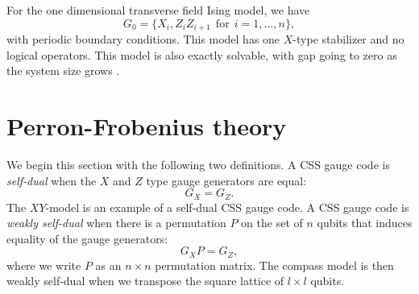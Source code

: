 For the one dimensional transverse field
Ising model, we have 
$$
    G_0 = \{ X_i, Z_i Z_{i+1}\ \ \mbox{for}\ \ i=1,...,n \},
$$
with periodic boundary conditions.
This model has one 
$X$-type stabilizer and no logical operators.
This model is also exactly solvable, with gap going to zero
as the system size grows \cite{Pfeuty1970}.

\section{Perron-Frobenius theory}



We begin this section with the following two definitions.
A CSS gauge code is \emph{self-dual} when the $X$ and $Z$ type
gauge generators are equal: $$G_X = G_Z.$$
The $XY$-model is an example of a self-dual CSS gauge code.
A CSS gauge code is \emph{weakly self-dual}
when there is a permutation $P$ on the set of $n$ qubits
that induces equality of the gauge generators:
$$
    G_X P = G_Z,
$$
where we write $P$ as an $n\times n$ permutation matrix.
The compass model is then weakly self-dual when we transpose
the square lattice of $l\times l$ qubits.

